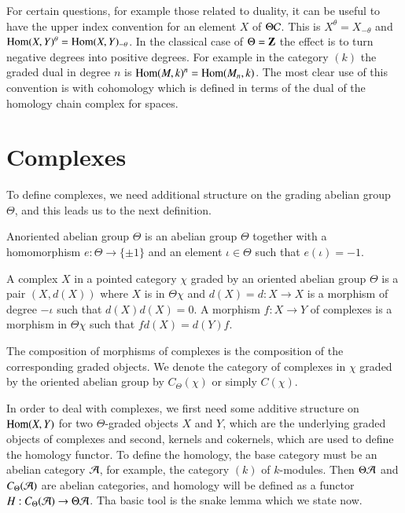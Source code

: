 \begin{notation}\label{chap1-not1.6}
For certain questions, for example those related to duality, it can be
useful to have the upper index convention for an element $X$ of
$\Theta\mathcal{C}$. This is $X^{\theta}=X_{-\theta}$ and
$\operatorname{Hom}(X,Y)^{\theta}=\operatorname{Hom}(X,Y)_{-\theta}$. In the classical case of
$\Theta=\mathbf{Z}$ the effect is to turn negative degrees into positive
degrees. For example in the category $(k)$ the graded dual in degree
$n$ is $\operatorname{Hom}(M,k)^{n}=\operatorname{Hom}(M_{n},k)$. The most clear use of this
convention is with cohomology which is defined in terms of the dual of
the homology chain complex for spaces.
\end{notation}

\section{Complexes}\label{chap1-sec2}

To define complexes, we need additional structure on the grading
abelian group $\Theta$, and this leads us to the next definition.

\begin{definition}\label{chap1-defi2.1}
An\pageoriginale oriented abelian group $\Theta$ is an abelian group $\Theta$
together with a homomorphism $e:\Theta\to \{\pm 1\}$ and an element
$\iota\in\Theta$ such that $e(\iota)=-1$.
\end{definition}

\begin{definition}\label{chap1-defi2.2}
A complex $X$ in a pointed category $\chi$ graded by an oriented
abelian group $\Theta$ is a pair $(X,d(X))$ where $X$ is in
$\Theta\chi$ and $d(X)=d:X\to X$ is a morphism of degree $-\iota$ such
that $d(X)d(X)=0$. A morphism $f:X\to Y$ of complexes is a morphism in
$\Theta \chi$ such that $fd(X)=d(Y)f$.
\end{definition}

The composition of morphisms of complexes is the composition of the
corresponding graded objects. We denote the category of complexes in
$\chi$ graded by the oriented abelian group by $C_{\Theta}(\chi)$ or
simply $C(\chi)$.

In order to deal with complexes, we first need some additive structure
on $\operatorname{Hom}(X,Y)$ for two $\Theta$-graded objects $X$ and $Y$, which are
the underlying graded objects of complexes and second, kernels and
cokernels, which are used to define the homology functor. To define
the homology, the base category must be an abelian category $\mathcal{A}$, for
example, the category $(k)$ of $k$-modules. Then $\Theta\mathcal{A}$ and
$C_{\Theta}(\mathcal{A})$ are abelian categories, and homology will be defined
as a functor $H:C_{\Theta}(\mathcal{A})\to \Theta\mathcal{A}$. Tha basic tool is the
snake lemma which we state now.

